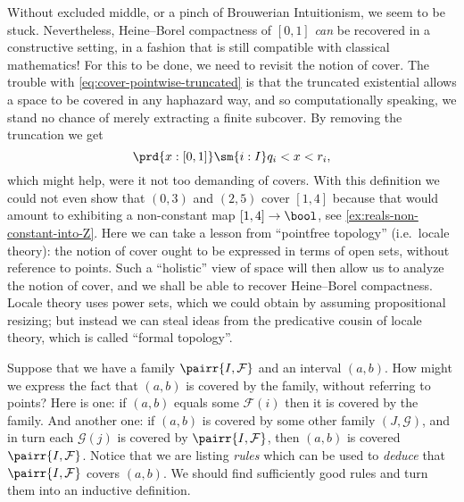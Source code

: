 Without excluded middle, or a pinch of Brouwerian Intuitionism, we seem to be stuck.
Nevertheless, Heine--Borel compactness of $[0,1]$ \emph{can} be recovered in a constructive
setting, in a fashion that is still compatible with classical mathematics! For this to be
done, we need to revisit the notion of cover. The trouble with
\eqref{eq:cover-pointwise-truncated} is that the truncated existential allows a space to
be covered in any haphazard way, and so computationally speaking, we stand no chance of
merely extracting a finite subcover. By removing the truncation we get
%
\begin{equation} \label{eq:cover-pointwise}
  \prd{x : [0,1]} \sm{i : I} q_i < x < r_i,
\end{equation}
%
which might help, were it not too demanding of covers. With this definition we
could not even show that $(0,3)$ and $(2,5)$ cover $[1,4]$ because that would amount
to exhibiting a non-constant map $[1,4] \to \bool$, see
\cref{ex:reals-non-constant-into-Z}.  Here we can take a lesson from ``pointfree topology''
%
%
(i.e.\ locale theory):
%
the notion of cover ought to be expressed in terms of open sets, without
reference to points. Such a ``holistic'' view of space will then allow us to analyze the
notion of cover, and we shall be able to recover Heine--Borel compactness.  Locale
theory uses power sets,
%
which we could obtain by assuming propositional resizing;
%
but instead we can steal ideas from the predicative cousin of locale theory,
%
which is called ``formal topology''.
%


Suppose that we have a family $\pairr{I, \mathcal{F}}$ and an interval $(a, b)$. How might
we express the fact that $(a,b)$ is covered by the family, without referring to points?
Here is one: if $(a, b)$ equals some $\mathcal{F}(i)$ then it is covered by the family.
And another one: if $(a,b)$ is covered by some other family $(J, \mathcal{G})$, and in
turn each $\mathcal{G}(j)$ is covered by $\pairr{I, \mathcal{F}}$, then $(a,b)$ is covered
$\pairr{I, \mathcal{F}}$. Notice that we are listing \emph{rules} which can be used to
\emph{deduce} that $\pairr{I, \mathcal{F}}$ covers $(a,b)$. We should find sufficiently
good rules and turn them into an inductive definition.

